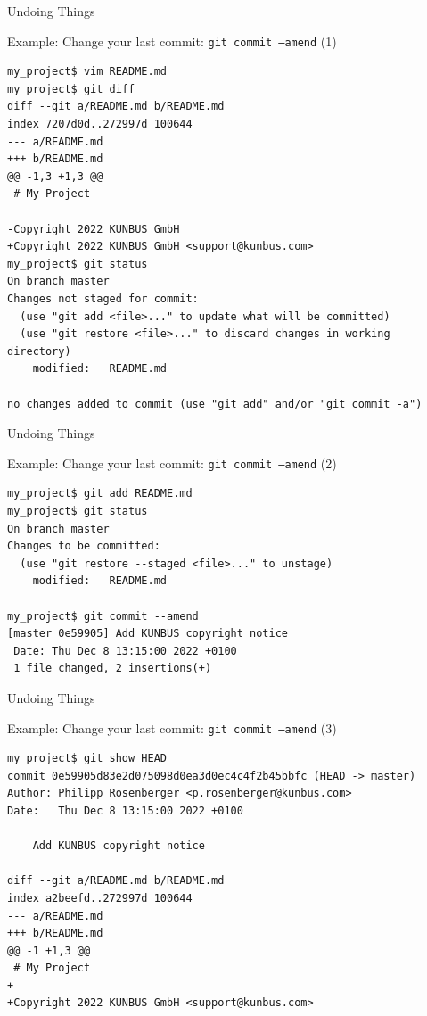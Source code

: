 \documentclass[aspectratio=169]{beamer}
\renewcommand{\footnotesize}{\tiny}
\newcommand{\sectiontitle}{}
\begin{document}
\begin{frame}[fragile]{Undoing Things}{\sectiontitle}
\begin{block}{Example: Change your last commit: \texttt{git commit --amend} {\small(1)}}
\begin{verbatim}
my_project$ vim README.md
my_project$ git diff
diff --git a/README.md b/README.md
index 7207d0d..272997d 100644
--- a/README.md
+++ b/README.md
@@ -1,3 +1,3 @@
 # My Project
 
-Copyright 2022 KUNBUS GmbH
+Copyright 2022 KUNBUS GmbH <support@kunbus.com>
my_project$ git status 
On branch master
Changes not staged for commit:
  (use "git add <file>..." to update what will be committed)
  (use "git restore <file>..." to discard changes in working directory)
    modified:   README.md

no changes added to commit (use "git add" and/or "git commit -a")
\end{verbatim}
\end{block}
\end{frame}

\begin{frame}[fragile]{Undoing Things}{\sectiontitle}
\begin{block}{Example: Change your last commit: \texttt{git commit --amend} {\small(2)}}
\begin{verbatim}
my_project$ git add README.md
my_project$ git status 
On branch master
Changes to be committed:
  (use "git restore --staged <file>..." to unstage)
    modified:   README.md

my_project$ git commit --amend
[master 0e59905] Add KUNBUS copyright notice
 Date: Thu Dec 8 13:15:00 2022 +0100
 1 file changed, 2 insertions(+)
\end{verbatim}
\end{block}
\end{frame}

\begin{frame}[fragile]{Undoing Things}{\sectiontitle}
\begin{block}{Example: Change your last commit: \texttt{git commit --amend} {\small(3)}}
\begin{verbatim}
my_project$ git show HEAD
commit 0e59905d83e2d075098d0ea3d0ec4c4f2b45bbfc (HEAD -> master)
Author: Philipp Rosenberger <p.rosenberger@kunbus.com>
Date:   Thu Dec 8 13:15:00 2022 +0100

    Add KUNBUS copyright notice

diff --git a/README.md b/README.md
index a2beefd..272997d 100644
--- a/README.md
+++ b/README.md
@@ -1 +1,3 @@
 # My Project
+
+Copyright 2022 KUNBUS GmbH <support@kunbus.com>
\end{verbatim}
\end{block}
\end{frame}
\end{document}

